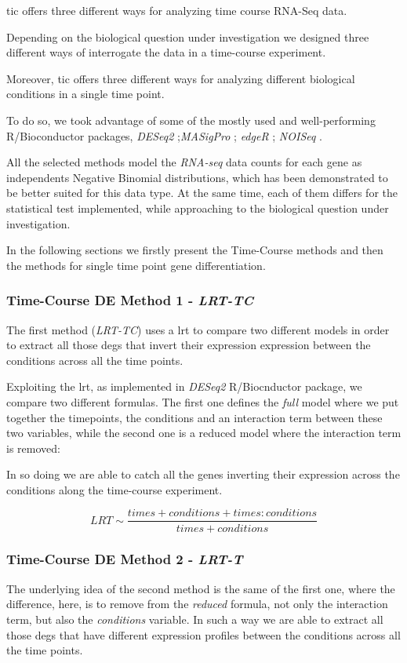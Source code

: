 \gls{tic} offers three different ways for analyzing time course RNA-Seq data.

Depending on the biological question under investigation we designed three different ways of interrogate the data in a time-course experiment.

Moreover, \gls{tic} offers three different ways for analyzing different biological conditions in a single time point.

To do so, we took advantage of some of the mostly used and well-performing \cite{Costa-Silva2017} R/Bioconductor packages, \textit{DESeq2} \cite{Love2014};\textit{MASigPro} \cite{Nueda2014}; \textit{edgeR} \cite{Robinson2009}; \textit{NOISeq} \cite{Tarazona2012}.

All the selected methods model the \textit{RNA-seq} data counts for each gene as independents Negative Binomial distributions, which has been demonstrated \cite{Robinson2007} to be better suited for this data type.
At the same time, each of them differs for the statistical test implemented, while approaching to the biological question under investigation.

In the following sections we firstly present the Time-Course methods and then the methods for single time point gene differentiation.

\subsubsection{Time-Course DE Method 1 - \textit{LRT-TC}}
The first method (\textit{LRT-TC}) uses a \gls{lrt} to compare two different models in order to extract all those \glspl{deg} that invert their expression expression between the conditions across all the time points.

Exploiting the \gls{lrt}, as implemented in \textit{DESeq2} R/Biocnductor package, we compare two different formulas.
The first one defines the \textit{full} model where we put together the timepoints, the conditions and an interaction term between these two variables, while the second one is a reduced model where the interaction term is removed:

In so doing we are able to catch all the genes inverting their expression across the conditions along the time-course experiment. 

\[LRT \sim \frac{times+conditions+times:conditions}{times+conditions}\]


\subsubsection{Time-Course DE Method 2 - \textit{LRT-T}}
The underlying idea of the second method is the same of the first one, where the difference, here, is to remove from the \textit{reduced} formula, not only the interaction term, but also the \textit{conditions} variable.
In such a way we are able to extract all those \glspl{deg} that have different expression profiles between the conditions across all the time points.

